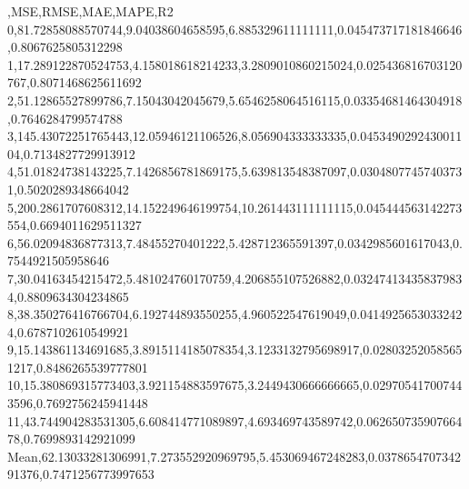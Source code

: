 ,MSE,RMSE,MAE,MAPE,R2
0,81.72858088570744,9.04038604658595,6.885329611111111,0.045473717181846646,0.8067625805312298
1,17.289122870524753,4.158018618214233,3.2809010860215024,0.025436816703120767,0.8071468625611692
2,51.12865527899786,7.15043042045679,5.6546258064516115,0.03354681464304918,0.7646284799574788
3,145.43072251765443,12.05946121106526,8.056904333333335,0.045349029243001104,0.7134827729913912
4,51.01824738143225,7.1426856781869175,5.639813548387097,0.03048077457403731,0.5020289348664042
5,200.2861707608312,14.152249646199754,10.261443111111115,0.045444563142273554,0.6694011629511327
6,56.02094836877313,7.48455270401222,5.428712365591397,0.0342985601617043,0.7544921505958646
7,30.04163454215472,5.481024760170759,4.206855107526882,0.032474134358379834,0.8809634304234865
8,38.350276416766704,6.192744893550255,4.960522547619049,0.04149256530332424,0.6787102610549921
9,15.143861134691685,3.8915114185078354,3.1233132795698917,0.028032520585651217,0.8486265539777801
10,15.380869315773403,3.921154883597675,3.2449430666666665,0.029705417007443596,0.7692756245941448
11,43.744904283531305,6.608414771089897,4.693469743589742,0.06265073590766478,0.7699893142921099
Mean,62.13033281306991,7.273552920969795,5.453069467248283,0.037865470734291376,0.7471256773997653
